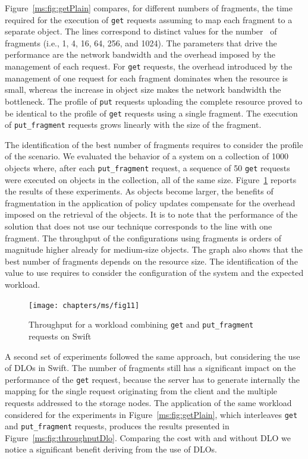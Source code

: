 Figure~\ref{ms:fig:getPlain} compares, for different numbers of fragments, the time required for the execution of {\tt get} requests assuming to map each fragment to a separate object. The lines correspond to distinct values for the number \fnum\ of fragments (i.e., 1, 4, 16, 64, 256, and 1024). The parameters that drive the performance are the network bandwidth and the overhead imposed by the management of each request. For {\tt get} requests, the overhead introduced by the management of one request for each fragment dominates when the resource is small, whereas the increase in object size makes the network bandwidth the bottleneck. The profile of {\tt put} requests uploading the complete resource proved to be identical to the profile of {\tt get} requests using a single fragment. The execution of {\tt put\_fragment} requests grows linearly with the size of the fragment.

The identification of the best number of fragments requires to consider the profile of the scenario. We evaluated the behavior of a system on a collection of 1000 objects where, after each {\tt put\_fragment} request, a sequence of 50 {\tt get} requests were executed on objects in the collection, all of the same size. Figure~\ref{ms:fig:throughputMget} reports the results of these experiments. As objects become larger, the benefits of fragmentation in the application of policy updates compensate for the overhead imposed on the retrieval of the objects. It is to note that the performance of the solution that does not use our technique corresponds to the line with one fragment. The throughput of the configurations using fragments is orders of magnitude higher already for medium-size objects. The graph also shows that the best number of fragments depends on the resource size. The identification of the value to use requires to consider the configuration of the system and the expected workload.

\begin{figure}[t]
\texttt{[image: chapters/ms/fig11]}
\caption{\label{ms:fig:throughputMget}Throughput for a workload combining {\tt get} and {\tt put\_fragment} requests on Swift}
\end{figure}

A second set of experiments followed the same approach, but considering the use of DLOs in Swift. The number of fragments still has a significant impact on the performance of the {\tt get} request, because the server has to generate internally the mapping for the single request originating from the client and the multiple requests addressed to the storage nodes. The application of the same workload considered for the experiments in Figure~\ref{ms:fig:getPlain}, which interleaves {\tt get} and {\tt put\_fragment} requests, produces the results presented in Figure~\ref{ms:fig:throughputDlo}. Comparing the cost with and without DLO we notice a significant benefit deriving from the use of DLOs.

